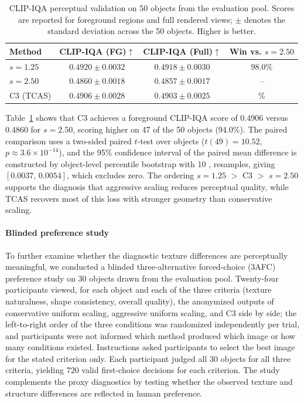 \documentclass[times,twocolumn,final]{elsarticle}
\providecommand{\DIFadd}[1]{{\protect\color{blue} \sf #1}} %
\providecommand{\DIFaddFL}[1]{\DIFadd{#1}} %
\begin{document}
\begin{table}[t]
\centering
\caption{\DIFaddFL{CLIP-IQA perceptual validation on 50 objects from the evaluation pool. Scores are reported for foreground regions and full rendered views; $\pm$ denotes the standard deviation across the 50 objects. Higher is better.}}
\label{tab:clipiqa}
\footnotesize\setlength{\tabcolsep}{4pt}
\begin{tabular}{lccc}
\toprule
\DIFaddFL{Method }& \DIFaddFL{CLIP-IQA (FG)$\uparrow$ }& \DIFaddFL{CLIP-IQA (Full)$\uparrow$ }& \DIFaddFL{Win vs. $s=2.50$ }\\
\midrule
\DIFaddFL{$s = 1.25$ }& \DIFaddFL{$\mathbf{0.4920 \pm 0.0032}$ }& \DIFaddFL{$\mathbf{0.4918 \pm 0.0030}$ }& \DIFaddFL{$\mathbf{98.0\%}$ }\\
\DIFaddFL{$s = 2.50$ }& \DIFaddFL{$0.4860 \pm 0.0018$ }& \DIFaddFL{$0.4857 \pm 0.0017$ }& \DIFaddFL{-- }\\
\DIFaddFL{C3 (TCAS) }& \DIFaddFL{$0.4906 \pm 0.0028$ }& \DIFaddFL{$0.4903 \pm 0.0025$ }& \DIFaddFL{94.0\% }\\
\bottomrule
\end{tabular}
\end{table}

\DIFadd{Table~\ref{tab:clipiqa} shows that C3 achieves a foreground CLIP-IQA score of 0.4906 versus 0.4860 for $s = 2.50$, scoring higher on 47 of the 50 objects (94.0\%). The paired comparison uses a two-sided paired $t$-test over objects ($t(49)=10.52$, $p\approx3.6\times10^{-14}$), and the 95\% confidence interval of the paired mean difference is constructed by object-level percentile bootstrap with 10}{\DIFadd{,}}\DIFadd{000 resamples, giving $[0.0037,\,0.0054]$, which excludes zero. The ordering $s = 1.25$ $>$ C3 $>$ $s = 2.50$ supports the diagnosis that aggressive scaling reduces perceptual quality, while TCAS recovers most of this loss with stronger geometry than conservative scaling.
}

\paragraph{\DIFadd{Blinded preference study}}
\DIFadd{To further examine whether the diagnostic texture differences are perceptually meaningful, we conducted a blinded three-alternative forced-choice (3AFC) preference study on 30 objects drawn from the evaluation pool. Twenty-four participants viewed, for each object and each of the three criteria (texture naturalness, shape consistency, overall quality), the anonymized outputs of conservative uniform scaling, aggressive uniform scaling, and C3 side by side; the left-to-right order of the three conditions was randomized independently per trial, and participants were not informed which method produced which image or how many conditions existed. Instructions asked participants to select the best image for the stated criterion only. Each participant judged all 30 objects for all three criteria, yielding 720 valid first-choice decisions for each criterion. The study complements the proxy diagnostics by testing whether the observed texture and structure differences are reflected in human preference.
}
\end{document}
